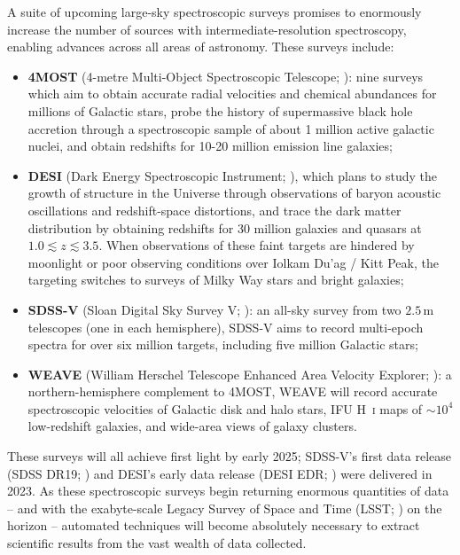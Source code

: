 \documentclass[fleqn,usenatbib]{mnras}
\begin{document}
A suite of upcoming large-sky spectroscopic surveys promises to enormously increase the number of sources with intermediate-resolution spectroscopy, enabling advances across all areas of astronomy.
These surveys include:
\begin{itemize}
\item
\textbf{4MOST}
(4-metre Multi-Object Spectroscopic Telescope; \citealt{4most}): nine surveys which aim to obtain accurate radial velocities and chemical abundances for millions of Galactic stars, probe the history of supermassive black hole accretion through a spectroscopic sample of about 1 million active galactic nuclei, and obtain redshifts for 10-20 million emission line galaxies;
\item
\textbf{DESI}
(Dark Energy Spectroscopic Instrument; \citealt{desii, desiii}), which plans to study the growth of structure in the Universe through observations of baryon acoustic oscillations and redshift-space distortions, and trace the dark matter distribution by obtaining redshifts for 30 million galaxies and quasars at $1.0\lesssim z \lesssim 3.5$.
When observations of these faint targets are hindered by moonlight or poor observing conditions over Iolkam Du'ag / Kitt Peak, the targeting switches to surveys of Milky Way stars and bright galaxies;
\item
\textbf{SDSS-V}
(Sloan Digital Sky Survey V; \citealt{sdssv}):
an all-sky survey from two $2.5\,\text{m}$ telescopes (one in each hemisphere), SDSS-V aims to record multi-epoch spectra for over six million targets, including five million Galactic stars;
\item
\textbf{WEAVE}
(William Herschel Telescope Enhanced Area Velocity Explorer; \citealt{weave}): a northern-hemisphere complement to 4MOST, WEAVE will record accurate spectroscopic velocities of Galactic disk and halo stars, IFU H~\textsc{i} maps of $\sim10^4$ low-redshift galaxies, and wide-area views of galaxy clusters.
\end{itemize}
These surveys will all achieve first light by early 2025; SDSS-V's first data release (SDSS DR19; \citealt{sdssdr19}) and DESI's early data release (DESI EDR; \citealt{desiedr}) were delivered in 2023.
As these spectroscopic surveys begin returning enormous quantities of data -- and with the exabyte-scale Legacy Survey of Space and Time (LSST; \citealt{lsst}) on the horizon -- automated techniques will become absolutely necessary to extract scientific results from the vast wealth of data collected.
\end{document}
